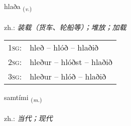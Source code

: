 \documentclass[frontgrid, backgrid]{flacards}\usepackage[]{graphicx}\usepackage[]{xcolor}
\begin{document}
\renewcommand{\flhead}{\vskip5pt \fboxsep=0pt {\small\bfseries\footnotesize Sagnorð | 动词}}
\renewcommand{\fcfoot}{\vskip5pt \fboxsep=0pt \hspace{2pt}{\small\bfseries\footnotesize 3K}}

\renewcommand{\blhead}{\vskip5pt {\small\bfseries\footnotesize Sagnorð | 动词 }}
\renewcommand{\bcfoot}{\vskip5pt \hspace{2pt}{\small\bfseries\footnotesize 3K}}


{hlaða \small{\textsubscript{(\textit{v.})}} \\[1ex] %
\textphonetic{[l̥aːða]} \\
zh.: \emph{装载（货车、轮船等）；堆放；加载} \\  [2ex]
\renewcommand*{\arraystretch}{0.8}
\begin{tabular}{p{1cm}l}
\textsc{1sg}: & hleð -- hlóð -- hlaðið \\ 
\textsc{2sg}: & hleður -- hlóðst -- hlaðið \\ 
\textsc{3sg}: & hleður -- hlóð -- hlaðið \\ 
\end{tabular}
}

\renewcommand{\flhead}{\vskip5pt \fboxsep=0pt {\small\bfseries\footnotesize Nafnorð | 名词}}
\renewcommand{\fcfoot}{\vskip5pt \fboxsep=0pt \hspace{2pt}{\small\bfseries\footnotesize 3K}}

\renewcommand{\blhead}{\vskip5pt {\small\bfseries\footnotesize Nafnorð | 名词 }}
\renewcommand{\bcfoot}{\vskip5pt \hspace{2pt}{\small\bfseries\footnotesize 3K}}


{samtími \small{\textsubscript{(\textit{m.})}} \\[1ex] %
\textphonetic{[samtʰimɪ]} \\
zh.: \emph{当代；现代} \\  [2ex]
\renewcommand*{\arraystretch}{0.8}
}
\end{document}
